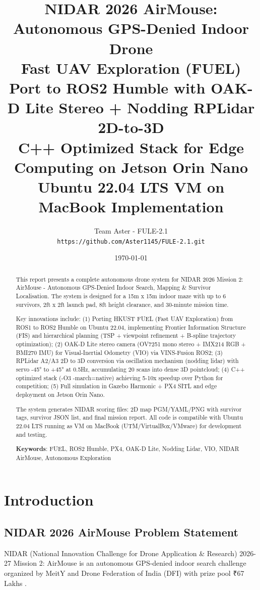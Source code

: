 \documentclass[12pt,a4paper]{article}
\title{\textbf{NIDAR 2026 AirMouse: Autonomous GPS-Denied Indoor Drone}\\
\large Fast UAV Exploration (FUEL) Port to ROS2 Humble with OAK-D Lite Stereo + Nodding RPLidar 2D-to-3D\\
\large C++ Optimized Stack for Edge Computing on Jetson Orin Nano\\
\large Ubuntu 22.04 LTS VM on MacBook Implementation}
\author{Team Aster - FULE-2.1\\
\texttt{https://github.com/Aster1145/FULE-2.1.git}}
\date{\today}
\begin{document}
\maketitle

\begin{abstract}
This report presents a complete autonomous drone system for NIDAR 2026 Mission 2: AirMouse - Autonomous GPS-Denied Indoor Search, Mapping \& Survivor Localisation. The system is designed for a 15m x 15m indoor maze with up to 6 survivors, 2ft x 2ft launch pad, 8ft height clearance, and 30-minute mission time. 

Key innovations include: (1) Porting HKUST FUEL (Fast UAV Exploration) from ROS1 to ROS2 Humble on Ubuntu 22.04, implementing Frontier Information Structure (FIS) and hierarchical planning (TSP + viewpoint refinement + B-spline trajectory optimization); (2) OAK-D Lite stereo camera (OV7251 mono stereo + IMX214 RGB + BMI270 IMU) for Visual-Inertial Odometry (VIO) via VINS-Fusion ROS2; (3) RPLidar A2/A3 2D to 3D conversion via oscillation mechanism (nodding lidar) with servo -45° to +45° at 0.5Hz, accumulating 20 scans into dense 3D pointcloud; (4) C++ optimized stack (-O3 -march=native) achieving 5-10x speedup over Python for competition; (5) Full simulation in Gazebo Harmonic + PX4 SITL and edge deployment on Jetson Orin Nano.

The system generates NIDAR scoring files: 2D map PGM/YAML/PNG with survivor tags, survivor JSON list, and final mission report. All code is compatible with Ubuntu 22.04 LTS running as VM on MacBook (UTM/VirtualBox/VMware) for development and testing.

\textbf{Keywords}: FUEL, ROS2 Humble, PX4, OAK-D Lite, Nodding Lidar, VIO, NIDAR AirMouse, Autonomous Exploration
\end{abstract}

\tableofcontents
\newpage

\section{Introduction}

\subsection{NIDAR 2026 AirMouse Problem Statement}
NIDAR (National Innovation Challenge for Drone Application \& Research) 2026-27 Mission 2: AirMouse is an autonomous GPS-denied indoor search challenge organized by MeitY and Drone Federation of India (DFI) with prize pool ₹67 Lakhs \cite{nidar}.
\end{document}
